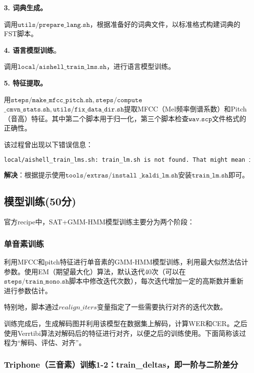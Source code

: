 \documentclass[a4paper]{article}
\renewcommand{\tt}[1]{\mathtt{#1}}
\begin{document}
\vspace{1em}
\textbf{3. 词典生成。} 

调用$\tt{utils/prepare\_lang.sh}$，根据准备好的词典文件，以标准格式构建词典的FST脚本。

\vspace{1em}
\textbf{4. 语言模型训练}。

调用$\tt{local/aishell\_train\_lms.sh}$，进行语言模型训练。

\vspace{1em}
\textbf{5. 特征提取。}

用$\tt{steps/make\_mfcc\_pitch.sh},\tt{steps/compute}$ $\tt{\_cmvn\_stats.sh}, \tt{utils/fix\_data\_dir.sh}$提取MFCC（Mel频率倒谱系数）和Pitch（音高）特征。其中第二个脚本用于归一化，第三个脚本检查$\tt{wav.scp}$文件格式的正确性。

\vspace{1.5em}
该过程曾出现以下错误信息：

\begin{lstlisting}[language=bash]
local/aishell_train_lms.sh: train_lm.sh is not found. That might mean it's not installed.
\end{lstlisting}

\textbf{解决}：根据提示使用$\tt{tools/extras/install}$ $\tt{\_kaldi\_lm.sh}$安装$\tt{train\_lm.sh}$即可。

\subsection{模型训练(50分)}

官方recipe中，SAT+GMM-HMM模型训练主要分为两个阶段：

\subsubsection{单音素训练}

利用MFCC和pitch特征进行单音素的GMM-HMM模型训练，利用最大似然法估计参数。使用EM（期望最大化）算法，默认迭代40次（可以在$\tt{steps/train\_mono.sh}$脚本中修改迭代次数），每次迭代增加一定的高斯数并重新进行参数估计。

特别地，脚本通过${realign\_iters}$变量指定了一些需要执行对齐的迭代次数。

训练完成后，生成解码图并利用该模型在数据集上解码，计算WER和CER。之后使用Verrtibi算法对解码后的特征进行对齐，以便之后的训练使用。下面简称该过程为“解码、评估、对齐”。

\subsubsection{Triphone（三音素）训练1-2：train\_deltas，即一阶与二阶差分} 
\end{document}
